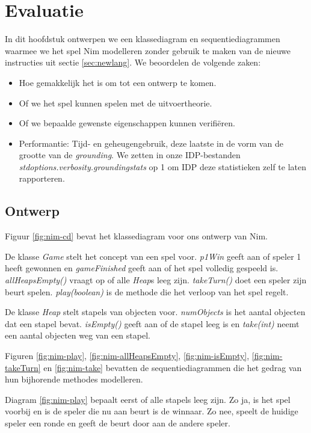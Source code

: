 \chapter{Evaluatie}\label{sec:evaluatie}

In dit hoofdstuk ontwerpen we een klassediagram en sequentiediagrammen waarmee we het spel Nim modelleren zonder gebruik te maken van de nieuwe instructies uit sectie \ref{sec:newlang}. We beoordelen de volgende zaken:

\begin{itemize}
	\item Hoe gemakkelijk het is om tot een ontwerp te komen.
	\item Of we het spel kunnen spelen met de uitvoertheorie.
	\item Of we bepaalde gewenste eigenschappen kunnen verifi\"eren.
	\item Performantie: Tijd- en geheugengebruik, deze laatste in de vorm van de grootte van de \textit{grounding}\cite{DeCatBroes2014PLaa}. We zetten in onze IDP-bestanden \textit{stdoptions.verbosity.groundingstats} op 1 om IDP deze statistieken zelf te laten rapporteren.
\end{itemize}

\section{Ontwerp}

Figuur \ref{fig:nim-cd} bevat het klassediagram voor ons ontwerp van Nim.

De klasse \textit{Game} stelt het concept van een spel voor. \textit{p1Win} geeft aan of speler 1 heeft gewonnen en \textit{gameFinished} geeft aan of het spel volledig gespeeld is. \textit{allHeapsEmpty()} vraagt op of alle \textit{Heap}s leeg zijn. \textit{takeTurn()} doet een speler zijn beurt spelen. \textit{play(boolean)} is de methode die het verloop van het spel regelt.

De klasse \textit{Heap} stelt stapels van objecten voor. \textit{numObjects} is het aantal objecten dat een stapel bevat. \textit{isEmpty()} geeft aan of de stapel leeg is en \textit{take(int)} neemt een aantal objecten weg van een stapel.

Figuren \ref{fig:nim-play}, \ref{fig:nim-allHeapsEmpty}, \ref{fig:nim-isEmpty}, \ref{fig:nim-takeTurn} en \ref{fig:nim-take} bevatten de sequentiediagrammen die het gedrag van hun bijhorende methodes modelleren.

Diagram \ref{fig:nim-play} bepaalt eerst of alle stapels leeg zijn. Zo ja, is het spel voorbij en is de speler die nu aan beurt is de winnaar. Zo nee, speelt de huidige speler een ronde en geeft de beurt door aan de andere speler.

